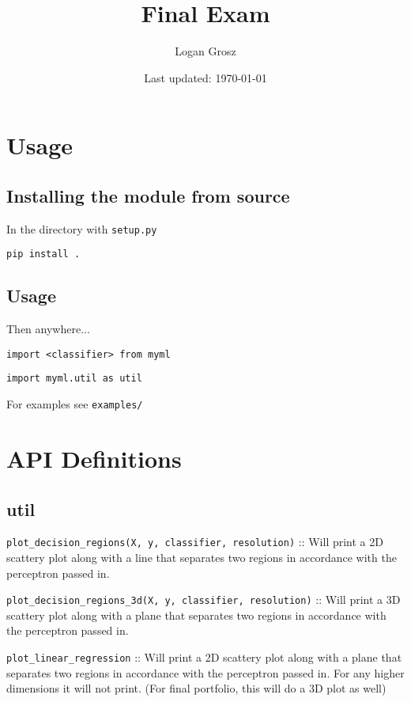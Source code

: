 \documentclass{article}
\title{Final Exam} \author{Logan Grosz} \date{Last updated: \today}
\begin{document}
\maketitle

\tableofcontents

\newpage

\section{Usage}

\subsection{Installing the module from source}

In the directory with \texttt{setup.py}

\texttt{pip install .}

\subsection{Usage}

Then anywhere...

\texttt{import <classifier> from myml}

\texttt{import myml.util as util}

For examples see \texttt{examples/}

\section{API Definitions}

\subsection{util}

\texttt{plot\_decision\_regions(X, y, classifier, resolution)} :: Will print a
2D scattery plot along with a line that separates two regions in accordance with
the perceptron passed in.

\texttt{plot\_decision\_regions\_3d(X, y, classifier, resolution)} :: Will print
a 3D scattery plot along with a plane that separates two regions in accordance
with the perceptron passed in.

\texttt{plot\_linear\_regression} :: Will print a 2D scattery plot along with a
plane that separates two regions in accordance with the perceptron passed in.
For any higher dimensions it will not print. (For final portfolio, this will do
a 3D plot as well)
\end{document}
